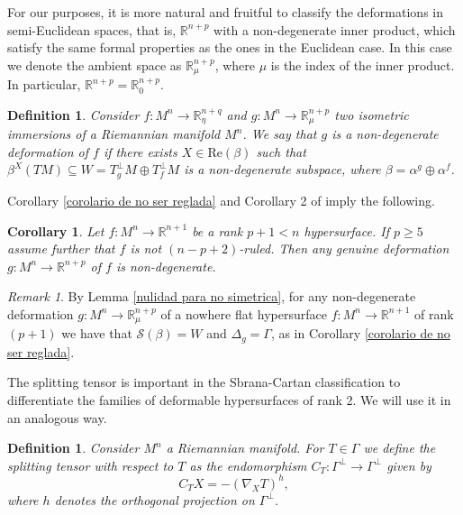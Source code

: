 \documentclass{article}
\newtheorem{cor}[thm]{Corollary}
\newtheorem{defn}[thm]{Definition}
\theoremstyle{remark}
\newtheorem{remark}[thm]{Remark}
\begin{document}
For our purposes, it is more natural and fruitful to classify the deformations in semi-Euclidean spaces, that is, $\mathbb{R}^{n+p}$ with a non-degenerate inner product, which satisfy the same formal properties as the ones in the Euclidean case. In this case we denote the ambient space as $\mathbb{R}^{n+p}_{\mu}$, where $\mu$ is the index of the inner product. In particular, $\mathbb{R}^{n+p}=\mathbb{R}^{n+p}_0$.

\begin{defn}\label{non-degenerate deformation}
    \normalfont Consider $f:M^n\rightarrow\mathbb{R}^{n+q}_{\eta}$ and $g:M^n\rightarrow\mathbb{R}^{n+p}_{\mu}$ two isometric immersions of a Riemannian manifold $M^n$. We say that $g$ is a {\it non-degenerate deformation} of $f$ if there exists $X\in\text{Re}(\beta)$ such that $\beta^X(TM)\subseteq W=T^\perp _gM\oplus T^\perp _fM$ is a non-degenerate subspace, where $\beta=\alpha^g\oplus\alpha^f$. 
\end{defn}

Corollary \ref{corolario de no ser reglada} and Corollary 2 of \cite{Moo} imply the following.
\begin{cor}\label{genuinas son no degeneradas}
    Let $f:M^n\rightarrow\mathbb{R}^{n+1}$ be a rank $p+1<n$ hypersurface. If $p\geq 5$ assume further that $f$ is not $(n-p+2)$-ruled. Then any genuine deformation $g:M^n\rightarrow\mathbb{R}^{n+p}$ of $f$ is non-degenerate. 
\end{cor}

\begin{remark}\label{remark de non degenerate}
    By Lemma \ref{nulidad para no simetrica}, for any non-degenerate deformation $g:M^n\rightarrow\mathbb{R}^{n+p}_{\mu}$ of a nowhere flat hypersurface $f:M^n\rightarrow\mathbb{R}^{n+1}$ of rank $(p+1)$ we have that $\mathcal{S}(\beta)=W$ and $\Delta_g=\Gamma$, as in Corollary \ref{corolario de no ser reglada}.
\end{remark}

The splitting tensor is important in the Sbrana-Cartan classification to differentiate the families of deformable hypersurfaces of rank 2. We will use it in an analogous way.
\begin{defn}\label{definicion spliting tensor}
    \normalfont Consider $M^n$ a Riemannian manifold. For $T\in\Gamma$ we define the {\it splitting tensor with respect to} $T$ as the endomorphism $C_T:\Gamma^\perp\rightarrow\Gamma^\perp$ given by
    \begin{equation*}\label{definicion del splitting tensor}
        C_TX=-(\nabla_X T)^h,
    \end{equation*}
    where $h$ denotes the orthogonal projection on $\Gamma^\perp$. 
\end{defn}
\end{document}
